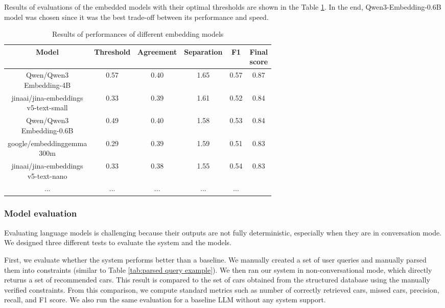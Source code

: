 \documentclass[fleqn,moreauthors,10pt]{ds_report}
\begin{document}
\vspace{5pt}
\noindent
Results of evaluations of the embedded models with their optimal thresholds are shown in the
Table \ref{tab:benchmark results}. In  the end, Qwen3-Embedding-0.6B model 
was chosen since it was the best trade-off between its performance and speed.
\begin{table}[H]
\resizebox{1.0 \linewidth}{!}
{\begin{tabular}{| c | c || c c c c |}

\hline
Model & Threshold &  Agreement & Separation & F1  & \makecell{Final \\ score} \\ 
\hline
\makecell{Qwen/Qwen3 \\ Embedding-4B}  &  0.57 &  0.40 & 1.65 & 0.57 & 0.87 \\
\hline
\makecell{jinaai/jina-embeddings \\ v5-text-small}  &  0.33 &  0.39 & 1.61 & 0.52 & 0.84 \\
\hline
\makecell{Qwen/Qwen3 \\ Embedding-0.6B}  &  0.49 &  0.40 & 1.58 & 0.53 & 0.84 \\
\hline
\makecell{google/embeddinggemma \\ 300m}  &  0.29 &  0.39 & 1.59 & 0.51 & 0.83 \\
\hline
\makecell{jinaai/jina-embeddings \\ v5-text-nano}   &  0.33 & 0.38 & 1.55 & 0.54 & 0.83 \\
\hline
 ... & ... & ... & ... & ... &  \\
\hline


\end{tabular}}
\caption{
    Results of performances of different embedding models
}
\label{tab:benchmark results}
\end{table}
\FloatBarrier


\subsubsection*{Model evaluation}



Evaluating language models is challenging because their outputs are not 
fully deterministic, especially when they are in conversation mode. We 
designed three different tests to evaluate the system and the models.

First, we evaluate whether the system performs better than a baseline. 
We manually created a set of user queries and manually parsed them into 
constraints (similar to Table \ref{tab:parsed query example}). 
We then ran our system in non-conversational mode, 
which directly returns a set of recommended cars. This result is compared 
to the set of cars obtained from the structured database using the manually 
verified constraints. From this comparison, we compute standard metrics 
such as number of correctly retrieved cars, missed cars, precision, recall, 
and F1 score. We also run the same evaluation for a baseline LLM without 
any system support.
\end{document}
